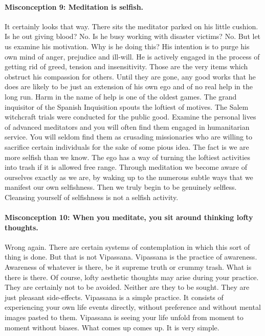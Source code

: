 \paragraph*{Misconception 9: Meditation is selfish.}
It certainly looks that way. There sits the meditator parked on his little
cushion. Is he out giving blood? No. Is he busy working with disaster victims?
No. But let us examine his motivation. Why is he doing this? His intention is to
purge his own mind of anger, prejudice and ill-will. He is actively engaged in
the process of getting rid of greed, tension and insensitivity. Those are the
very items which obstruct his compassion for others. Until they are gone, any
good works that he does are likely to be just an extension of his own ego and of
no real help in the long run. Harm in the name of help is one of the oldest
games. The grand inquisitor of the Spanish Inquisition spouts the loftiest of
motives. The Salem witchcraft trials were conducted for the public good.
Examine the personal lives of advanced meditators and you will often find them
engaged in humanitarian service. You will seldom find them as crusading
missionaries who are willing to sacrifice certain individuals for the sake of
some pious idea. The fact is we are more selfish than we know. The ego has a way
of turning the loftiest activities into trash if it is allowed free range.
Through meditation we become aware of ourselves exactly as we are, by waking up
to the numerous subtle ways that we manifest our own selfishness. Then we truly
begin to be genuinely selfless. Cleansing yourself of selfishness is not a
selfish activity.

\paragraph*{Misconception 10: When you meditate, you sit around thinking lofty thoughts.}
Wrong again. There are certain systems of contemplation in which this sort of
thing is done. But that is not Vipassana. Vipassana is the practice of
awareness. Awareness of whatever is there, be it supreme truth or crummy trash.
What is there is there. Of course, lofty aesthetic thoughts may arise during
your practice. They are certainly not to be avoided. Neither are they to be
sought. They are just pleasant side-effects. Vipassana is a simple practice. It
consists of experiencing your own life events directly, without preference and
without mental images pasted to them. Vipassana is seeing your life unfold from
moment to moment without biases. What comes up comes up. It is very simple.

